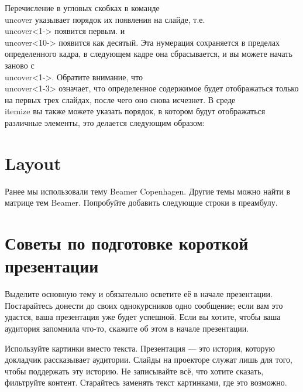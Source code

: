 \documentclass{article}
\begin{document}
Перечисление в угловых скобках в команде \\uncover указывает порядок их появления на слайде, т.е. \\uncover<1-> появится первым.
и \\uncover<10-> появится как десятый. Эта нумерация сохраняется в пределах определенного
кадра, в следующем кадре она сбрасывается, и вы можете начать заново с \\uncover<1->.
Обратите внимание, что \\uncover<1-3> означает, что определенное содержимое будет отображаться только на первых
трех слайдах, после чего оно снова исчезнет.
В среде \\itemize вы также можете указать порядок, в котором будут отображаться
различные элементы, это делается следующим образом:

\begin{frame}
\end{frame}


  \section{Layout}
  \label{sec:layout}


  Ранее мы использовали тему Beamer Copenhagen. Другие темы можно найти в
  матрице тем Beamer. Попробуйте добавить следующие строки в преамбулу.


  \section{Советы по подготовке короткой презентации}
  \label{sec:tips}

  \begin{frame}{Выделите основную тему и обязательно осветите её в начале презентации.}
  Постарайтесь донести до своих однокурсников одно сообщение; если вам это удастся,
  ваша презентация уже будет успешной. Если вы хотите, чтобы ваша аудитория запомнила
  что-то, скажите об этом в начале презентации.
  \end{frame}

    \begin{frame}{Используйте картинки вместо текста.}
  Презентация — это история, которую докладчик рассказывает аудитории. Слайды на проекторе служат лишь для того, чтобы поддержать эту историю. Не записывайте всё, что хотите сказать,
фильтруйте контент. Старайтесь заменять текст картинками, где это возможно.
  \end{frame}
\end{document}

